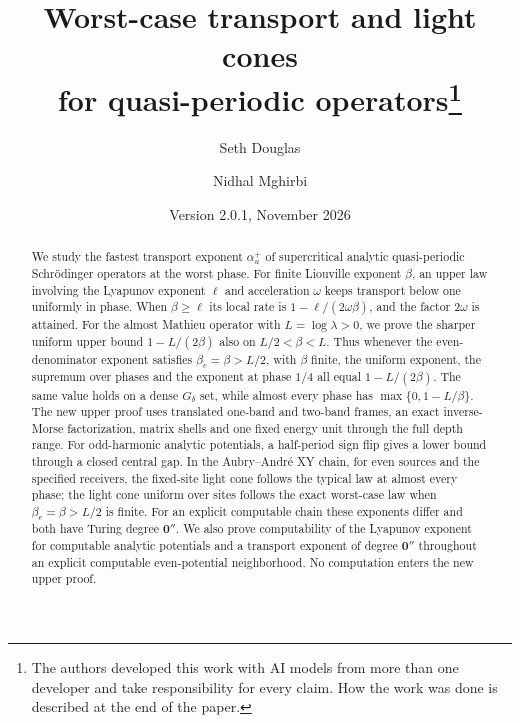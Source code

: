 \documentclass[11pt]{article}
\title{Worst-case transport and light cones\\ for quasi-periodic operators\thanks{The authors developed this work with AI models from more than one developer and take responsibility for every claim. How the work was done is described at the end of the paper.}}
\author{Seth Douglas \and Nidhal Mghirbi}
\date{Version 2.0.1, November 2026}
\theoremstyle{definition}
\begin{document}
\maketitle
\begin{abstract}
We study the fastest transport exponent $\alpha_u^+$ of supercritical analytic quasi-periodic Schr\"odinger operators at the worst phase. For finite Liouville exponent $\beta$, an upper law involving the Lyapunov exponent $\ell$ and acceleration $\omega$ keeps transport below one uniformly in phase. When $\beta\ge\ell$ its local rate is $1-\ell/(2\omega\beta)$, and the factor $2\omega$ is attained. For the almost Mathieu operator with $L=\log\lambda>0$, we prove the sharper uniform upper bound $1-L/(2\beta)$ also on $L/2<\beta<L$. Thus whenever the even-denominator exponent satisfies $\beta_e=\beta>L/2$, with $\beta$ finite, the uniform exponent, the supremum over phases and the exponent at phase $1/4$ all equal $1-L/(2\beta)$. The same value holds on a dense $G_\delta$ set, while almost every phase has $\max\{0,1-L/\beta\}$. The new upper proof uses translated one-band and two-band frames, an exact inverse-Morse factorization, matrix shells and one fixed energy unit through the full depth range. For odd-harmonic analytic potentials, a half-period sign flip gives a lower bound through a closed central gap. In the Aubry--Andr\'e XY chain, for even sources and the specified receivers, the fixed-site light cone follows the typical law at almost every phase; the light cone uniform over sites follows the exact worst-case law when $\beta_e=\beta>L/2$ is finite. For an explicit computable chain these exponents differ and both have Turing degree $\mathbf0''$. We also prove computability of the Lyapunov exponent for computable analytic potentials and a transport exponent of degree $\mathbf0''$ throughout an explicit computable even-potential neighborhood. No computation enters the new upper proof.
\end{abstract}

{\small\tableofcontents}
















\appendix



{\small}
\end{document}
